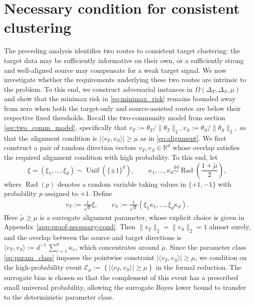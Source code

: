 \documentclass[10pt]{article}
\newcommand{\R}{\mathbb R}
\newcommand{\ip}[2]{\langle #1,#2\rangle}
\newcommand{\wt}{\widetilde}
\newcommand{\trg}{T}
\newcommand{\thetaT}{\theta_{\trg}}
\newcommand{\DeltaT}{\Delta_{\trg}}
\newcommand{\src}{S}
\newcommand{\thetaS}{\theta_{\src}}
\newcommand{\DeltaS}{\Delta_{\src}}
\begin{document}
 

\section{Necessary condition for consistent clustering}
\label{sec:necessary_cond}
The preceding analysis identifies two routes to consistent target clustering:
the target data may be sufficiently informative on their own, or a sufficiently
strong and well-aligned source may compensate for a weak target signal. We now
investigate whether the requirements underlying these two routes are intrinsic
to the problem. To this end, we construct adversarial instances in
$\Omega(\DeltaT,\DeltaS,\mu)$ and show that the minimax risk in
\eqref{eq:minimax_risk} remains bounded away from zero when both the target-only
and source-assisted routes are below their respective fixed thresholds.
Recall the two-community model from section \ref{sec:two_comm_model}, specifically that
 \(
     v_{\trg}:=\thetaT/\|\thetaT\|_2,
     v_{\src}:=\thetaS/\|\thetaS\|_2,
 \)
 so that the alignment condition is $|\ip{v_{\trg}}{v_{\src}}|\ge \mu$ as in \eqref{eq:alignment}.
We first construct a pair of random direction vectors $v_{\trg},v_{\src}\in\R^d$
whose overlap satisfies the required alignment condition with high probability.
To this end, let
\[
\xi=(\xi_1,\ldots,\xi_d)\sim\operatorname{Unif}(\{\pm1\}^d),\qquad
\kappa_1,\ldots,\kappa_d \overset{\mathrm{iid}}{\sim}
    \operatorname{Rad}\left(\frac{1+\wt\mu}{2}\right),
\]
where $\operatorname{Rad}(p)$ denotes a random variable taking values in
$\{+1,-1\}$ with probability $p$ assigned to $+1$. Define
\begin{align}
\label{eq:construct_signal_adv}
v_{\trg}:=\frac{1}{\sqrt d}\xi, \qquad
v_{\src}:=\frac{1}{\sqrt d}(\xi_1\kappa_1,\ldots,\xi_d\kappa_d).
\end{align}
Here $\wt\mu\ge\mu$ is a surrogate alignment parameter, whose explicit
choice is given in Appendix~\ref{app:proof-necessary-cond}. Then
$\|v_{\trg}\|_2=\|v_{\src}\|_2=1$ almost surely, and the overlap between the
source and target directions is $\langle v_{\trg},v_{\src}\rangle:=d^{-1}\,\sum_{r=1}^d \kappa_r$,
which concentrates around $\wt\mu$. Since the parameter class
\eqref{eq:param_class} imposes the pointwise constraint
$|\ip{v_{\trg}}{v_{\src}}|\ge \mu$, we condition on the high-probability event $\mathcal E_{\mu}:=\left\{|\ip{v_{\trg}}{v_{\src}}|\ge \mu\right\}$
in the formal reduction. The surrogate bias is chosen so that the complement
of this event has a prescribed small universal probability, allowing the
surrogate Bayes lower bound to transfer to the deterministic parameter class.
\end{document}
